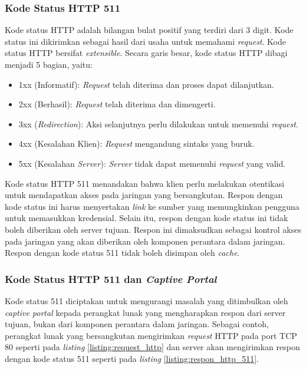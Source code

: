 \subsubsection{Kode Status HTTP 511}
\label{par:http_511}

Kode status HTTP adalah bilangan bulat positif yang terdiri dari 3 digit\cite{IETF_HTTP:2016}. Kode status ini dikirimkan sebagai hasil dari usaha untuk memahami \textit{request}. Kode status HTTP bersifat \textit{extensible}. Secara garis besar, kode status HTTP dibagi menjadi 5 bagian, yaitu:

\begin{itemize}
    \item{1xx (Informatif): \textit{Request} telah diterima dan proses dapat dilanjutkan.}
    \item{2xx (Berhasil): \textit{Request} telah diterima dan dimengerti.}
    \item{3xx (\textit{Redirection}): Aksi selanjutnya perlu dilakukan untuk memenuhi \textit{request}.}
    \item{4xx (Kesalahan Klien): \textit{Request} mengandung sintaks yang buruk.}
    \item{5xx (Kesalahan \textit{Server}): \textit{Server} tidak dapat memenuhi \textit{request} yang valid.}
\end{itemize}

Kode status HTTP 511 menandakan bahwa klien perlu melakukan otentikasi untuk mendapatkan akses pada jaringan yang bersangkutan\cite{IETF_HTTP_AdditionalStatus:2016}. Respon dengan kode status ini harus menyertakan \textit{link} ke sumber yang memungkinkan pengguna untuk memasukkan kredensial. Selain itu, respon dengan kode status ini tidak boleh diberikan oleh server tujuan. Respon ini dimaksudkan sebagai kontrol akses pada jaringan yang akan diberikan oleh komponen perantara dalam jaringan. Respon dengan kode status 511 tidak boleh disimpan oleh \textit{cache}.

\subsubsection{Kode Status HTTP 511 dan \textit{Captive Portal}}
\label{par:http_511_and_captive_portal}

Kode status 511 diciptakan untuk mengurangi masalah yang ditimbulkan oleh \textit{captive portal} kepada perangkat lunak yang mengharapkan respon dari server tujuan, bukan dari komponen perantara dalam jaringan. Sebagai contoh, perangkat lunak yang bersangkutan mengirimkan \textit{request} HTTP pada port TCP 80 seperti pada \textit{listing} \ref{listing:request_http} dan server akan mengirimkan respon dengan kode status 511 seperti pada \textit{listing} \ref{listing:respon_http_511}.

